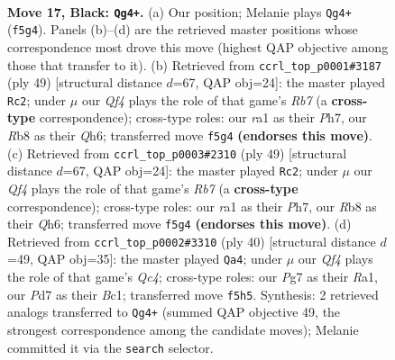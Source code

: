 \documentclass[11pt]{article}
\begin{document}
\clearpage

\begin{figure}[p]\centering
\begin{subfigure}{0.46\textwidth}\centering
\resizebox{\linewidth}{!}{%
\newchessgame
\chessboard[
  setfen={1rb1k2r/p1pp1pp1/2p4p/4Pq2/8/P2BQ3/P1P5/R2KR3 b k - 5 17},
  showmover=false,
  pgfstyle=straightmove, color=movearrow, markmove={f5-g4}
]}
\caption{}
\end{subfigure}\hfill
\begin{subfigure}{0.46\textwidth}\centering
\resizebox{\linewidth}{!}{%
\newchessgame
\chessboard[
  setfen={5r1k/5ppp/3p3q/3Bp3/4P3/R5PP/1r1b1P2/Q4RK1 b - - 4 25},
  showmover=false,
  pgfstyle=straightmove, color=movearrow, markmove={b2-c2}
]}
\caption{}
\end{subfigure}
\\[4pt]
\begin{subfigure}{0.46\textwidth}\centering
\resizebox{\linewidth}{!}{%
\newchessgame
\chessboard[
  setfen={5r1k/5ppp/3p3q/3Bp3/4P3/R5PP/1r1b1P2/Q4RK1 b - - 4 25},
  showmover=false,
  pgfstyle=straightmove, color=movearrow, markmove={b2-c2}
]}
\caption{}
\end{subfigure}\hfill
\begin{subfigure}{0.46\textwidth}\centering
\resizebox{\linewidth}{!}{%
\newchessgame
\chessboard[
  setfen={r2qr1k1/2p2pp1/p3b2p/4P3/2Q5/2P4P/P4PP1/R1B1R1K1 w - - 1 21},
  showmover=false,
  pgfstyle=straightmove, color=movearrow, markmove={c4-a4}
]}
\caption{}
\end{subfigure}
\caption{\textbf{Move 17, Black: \texttt{Qg4+}.} (a) Our position; Melanie plays \texttt{Qg4+} (\texttt{f5g4}). Panels (b)--(d) are the retrieved master positions whose correspondence most drove this move (highest QAP objective among those that transfer to it). (b) Retrieved from \texttt{ccrl\_top\_p0001\#3187} (ply 49) [structural distance $d$=67, QAP obj=24]: the master played \texttt{Rc2}; under $\mu$ our \emph{Qf4} plays the role of that game's \emph{Rb7} (a \textbf{cross-type} correspondence); cross-type roles: our \emph{r}a1 as their \emph{P}h7, our \emph{R}b8 as their \emph{Q}h6; transferred move \texttt{f5g4} \textbf{(endorses this move)}. (c) Retrieved from \texttt{ccrl\_top\_p0003\#2310} (ply 49) [structural distance $d$=67, QAP obj=24]: the master played \texttt{Rc2}; under $\mu$ our \emph{Qf4} plays the role of that game's \emph{Rb7} (a \textbf{cross-type} correspondence); cross-type roles: our \emph{r}a1 as their \emph{P}h7, our \emph{R}b8 as their \emph{Q}h6; transferred move \texttt{f5g4} \textbf{(endorses this move)}. (d) Retrieved from \texttt{ccrl\_top\_p0002\#3310} (ply 40) [structural distance $d$=49, QAP obj=35]: the master played \texttt{Qa4}; under $\mu$ our \emph{Qf4} plays the role of that game's \emph{Qc4}; cross-type roles: our \emph{P}g7 as their \emph{R}a1, our \emph{P}d7 as their \emph{B}c1; transferred move \texttt{f5h5}. Synthesis: 2 retrieved analogs transferred to \texttt{Qg4+} (summed QAP objective 49, the strongest correspondence among the candidate moves); Melanie committed it via the \texttt{search} selector.}
\label{fig:thought-m33}
\end{figure}
\end{document}
